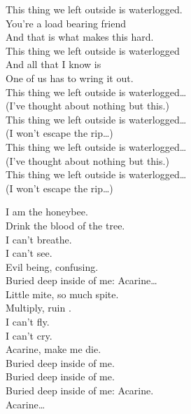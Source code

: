 This thing we left outside is waterlogged. \\
You're a load bearing friend \\
And that is what makes this hard. \\
This thing we left outside is waterlogged \\
And all that I know is \\
One of us has to wring it out. \\

This thing we left outside is waterlogged… \\
(I've thought about nothing but this.) \\

This thing we left outside is waterlogged… \\
(I won't escape the rip…) \\

This thing we left outside is waterlogged… \\
(I've thought about nothing but this.) \\

This thing we left outside is waterlogged… \\
(I won't escape the rip…) \\





I am the honeybee. \\
Drink the blood of the tree. \\
I can't breathe. \\
I can't see. \\
Evil being, confusing. \\

Buried deep inside of me: Acarine… \\

Little mite, so much spite. \\
Multiply, ruin . \\
I can't fly. \\
I can't cry. \\
Acarine, make me die. \\

Buried deep inside of me. \\
Buried deep inside of me. \\
Buried deep inside of me: Acarine. \\
Acarine… \\

